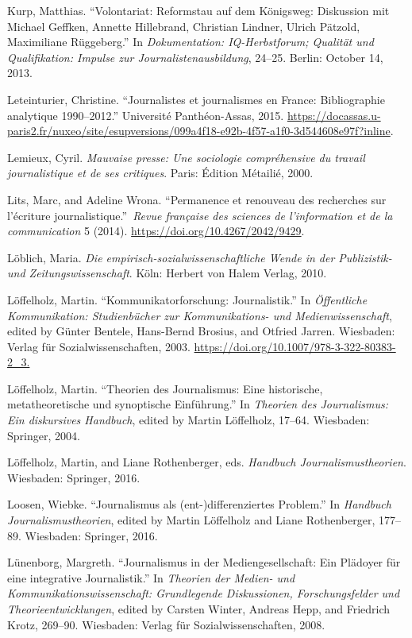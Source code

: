 \documentclass{tufte-handout}
\begin{document}
\begin{hangparas}{.25in}{1}
Kurp, Matthias. ``Volontariat: Reformstau auf dem Königsweg: Diskussion
mit Michael Geffken, Annette Hillebrand, Christian Lindner, Ulrich
Pätzold, Maximiliane Rüggeberg.'' In \emph{Dokumentation:
IQ-Herbstforum; Qualität und Qualifikation: Impulse zur
Journalistenausbildung}, 24--25. Berlin: October 14, 2013.

Leteinturier, Christine. ``Journalistes et journalismes en France:
Bibliographie analytique 1990--2012.'' Université Panthéon-Assas, 2015.
\url{https://docassas.u-paris2.fr/nuxeo/site/esupversions/099a4f18-e92b-4f57-a1f0-3d544608e97f?inline}.

Lemieux, Cyril. \emph{Mauvaise presse: Une sociologie compréhensive du
travail journalistique et de ses critiques}. Paris: Édition Métailié,
2000.

Lits, Marc, and Adeline Wrona. ``Permanence et renouveau des recherches
sur l'écriture journalistique.''~\emph{Revue française des sciences de
l'information et de la communication} 5 (2014).
\url{https://doi.org/10.4267/2042/9429}.

Löblich, Maria. \emph{Die empirisch-sozialwissenschaftliche Wende in der
Publizistik- und Zeitungswissenschaft}. Köln: Herbert von Halem Verlag,
2010.

Löffelholz, Martin. ``Kommunikatorforschung: Journalistik.'' In
\emph{Öffentliche Kommunikation: Studienbücher zur Kommunikations- und
Medienwissenschaft}, edited by Günter Bentele, Hans-Bernd Brosius, and
Otfried Jarren. Wiesbaden: Verlag für Sozialwissenschaften, 2003.
\href{https://doi.org/10.4267/2042/9429}{https://doi.org/10.1007/978-3-322-80383-2\_3.}

Löffelholz, Martin. ``Theorien des Journalismus: Eine historische,
metatheoretische und synoptische Einführung.'' In \emph{Theorien des
Journalismus: Ein diskursives Handbuch}, edited by Martin Löffelholz,
17--64. Wiesbaden: Springer, 2004.

Löffelholz, Martin, and Liane Rothenberger, eds. \emph{Handbuch
Journalismustheorien}. Wiesbaden: Springer, 2016.

Loosen, Wiebke. ``Journalismus als (ent-)differenziertes Problem.'' In
\emph{Handbuch Journalismustheorien}, edited by Martin Löffelholz and
Liane Rothenberger, 177--89. Wiesbaden: Springer, 2016.

Lünenborg, Margreth. ``Journalismus in der Mediengesellschaft: Ein
Plädoyer für eine integrative Journalistik.'' In \emph{Theorien der
Medien- und Kommunikationswissenschaft: Grundlegende Diskussionen,
Forschungsfelder und Theorieentwicklungen}, edited by Carsten Winter,
Andreas Hepp, and Friedrich Krotz, 269--90. Wiesbaden: Verlag für
Sozialwissenschaften, 2008.


\end{hangparas}
\end{document}
